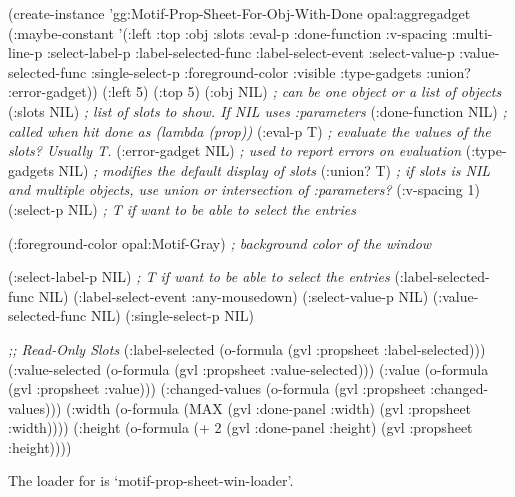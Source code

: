 \begin{programexample}
(create-instance 'gg:Motif-Prop-Sheet-For-Obj-With-Done opal:aggregadget
    (:maybe-constant '(:left :top :obj :slots :eval-p :done-function :v-spacing
		       :multi-line-p :select-label-p :label-selected-func
                       :label-select-event :select-value-p :value-selected-func
                       :single-select-p	:foreground-color :visible :type-gadgets
                       :union? :error-gadget))
    (:left 5) (:top 5)
    (:obj NIL)            {\it ; can be one object or a list of objects}
    (:slots NIL)          {\it ; list of slots to show.  If NIL uses :parameters}
    (:done-function NIL)  {\it ; called when hit done as (lambda (prop))}
    (:eval-p T)           {\it ; evaluate the values of the slots?  Usually T.}
    (:error-gadget NIL)   {\it ; used to report errors on evaluation}
    (:type-gadgets NIL)   {\it ; modifies the default display of slots}
    (:union? T)  {\it ; if slots is NIL and multiple objects, use union or intersection of :parameters?}
    (:v-spacing 1)
    (:select-p NIL)       {\it ; T if want to be able to select the entries}

    (:foreground-color opal:Motif-Gray) {\it ; background color of the window}

    (:select-label-p NIL) {\it ; T if want to be able to select the entries}
    (:label-selected-func NIL)
    (:label-select-event :any-mousedown)
    (:select-value-p NIL)
    (:value-selected-func NIL)
    (:single-select-p NIL)

   {\it ;; Read-Only Slots}
    (:label-selected (o-formula (gvl :propsheet :label-selected)))
    (:value-selected (o-formula (gvl :propsheet :value-selected)))
    (:value (o-formula (gvl :propsheet :value)))
    (:changed-values (o-formula (gvl :propsheet :changed-values)))
    (:width (o-formula (MAX (gvl :done-panel :width)
			    (gvl :propsheet :width))))
    (:height (o-formula (+ 2 (gvl :done-panel :height)
			   (gvl :propsheet :height))))

\end{programexample}

The loader for  is
`motif-prop-sheet-win-loader'.





